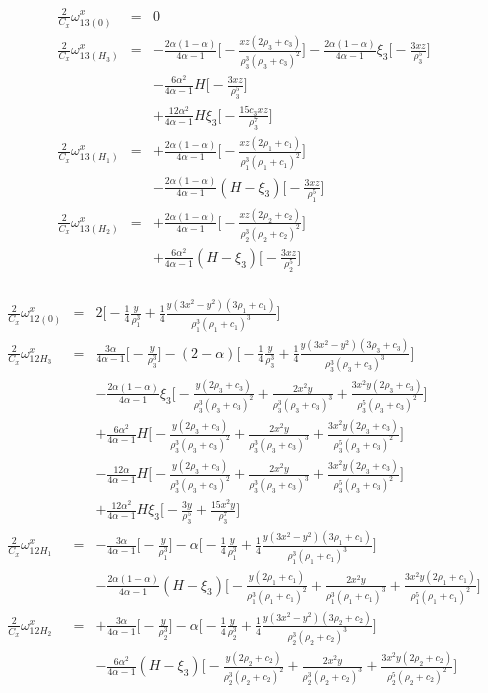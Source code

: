 \documentclass[a4j,fleqn]{jarticle}
\newcommand{\al}{\alpha}
\newcommand{\all}{4\alpha-1}
\newcommand{\cc}[1]{c_{#1}}
\newcommand{\rr}[1]{\rho_{#1}}
\newcommand{\rc}[1]{\rho_{#1}+\cc{#1}}
\begin{document}
\begin{eqnarray*}
\frac{2}{C_x}\omega_{13 (0)}^x&=&0\\
\frac{2}{C_x}\omega_{13 (H_3)}^x&=&
 -\frac{2\al(1-\al)}{\all}\biggr[
 -\frac{xz(2\rr3+\cc3)}{\rr3^3(\rc3)^2}
 \biggr]
%
-\frac{2\al(1-\al)}{\all}\xi_3\biggr[
-\frac{3xz}{\rr3^5}
\biggr]\\
%
&&-\frac{6\al^2}{\all}H\biggr[
-\frac{3xz}{\rr3^5}
\biggr]\\
%
&&+\frac{12\al^2}{\all}H\xi_3\biggr[
-\frac{15\cc3 xz}{\rr3^7}
\biggr]\\
\frac{2}{C_x}\omega_{13 (H_1)}^x&=&
+\frac{2\al(1-\al)}{\all}\biggr[
 -\frac{xz(2\rr1+\cc1)}{\rr1^3(\rc1)^2}
 \biggr]\\
%
&&-\frac{2\al(1-\al)}{\all}(H-\xi_3)\biggr[
 -\frac{3xz}{\rr1^5}
 \biggr]\\
\frac{2}{C_x}\omega_{13 (H_2)}^x&=&
+\frac{2\al(1-\al)}{\all}\biggr[
 -\frac{xz(2\rr2+\cc2)}{\rr2^3(\rc2)^2}
 \biggr]\\
%
&&+\frac{6\al^2}{\all}(H-\xi_3)\biggr[
-\frac{3xz}{\rr2^5}
\biggr]\\
\end{eqnarray*}
\vspace{0.2cm}

\begin{eqnarray*}
\frac{2}{C_x}\omega_{12 (0)}^x&=&
2\biggr[
-\frac{1}{4}\frac{y}{\rr1^3}
+\frac{1}{4}\frac{y(3x^2-y^2)(3\rr1+\cc1)}{\rr1^3(\rc1)^3}
\biggr]\\
\frac{2}{C_x}\omega_{12 H_3}^x&=&
\frac{3\al}{\all}\biggr[
-\frac{y}{\rr3^3}
\biggr]
-(2-\al)\biggr[
-\frac{1}{4}\frac{y}{\rr3^3}
+\frac{1}{4}\frac{y(3x^2-y^2)(3\rr3+\cc3)}{\rr3^3(\rc3)^3}
\biggr]\\
%
&&-\frac{2\al(1-\al)}{\all}\xi_3\biggr[
-\frac{y(2\rr3+\cc3)}{\rr3^3(\rc3)^2}+\frac{2x^2y}{\rr3^3(\rc3)^3}
+\frac{3x^2y(2\rr3+\cc3)}{\rr3^5(\rc3)^2}
\biggr]\\
%
&&+\frac{6\al^2}{\all}H\biggr[
-\frac{y(2\rr3+\cc3)}{\rr3^3(\rc3)^2}+\frac{2x^2y}{\rr3^3(\rc3)^3}
+\frac{3x^2y(2\rr3+\cc3)}{\rr3^5(\rc3)^2}
\biggr]\\
%
&&-\frac{12\al}{\all}H\biggr[
-\frac{y(2\rr3+\cc3)}{\rr3^3(\rc3)^2}+\frac{2x^2y}{\rr3^3(\rc3)^3}
+\frac{3x^2y(2\rr3+\cc3)}{\rr3^5(\rc3)^2}
\biggr]\\
%
&&+\frac{12\al^2}{\all}H\xi_3\biggr[
-\frac{3y}{\rr3^5}+\frac{15x^2y}{\rr3^7}
\biggr]\\
\frac{2}{C_x}\omega_{12 H_1}^x&=&
-\frac{3\al}{\all}\biggr[
-\frac{y}{\rr1^3}
\biggr]
-\al\biggr[
-\frac{1}{4}\frac{y}{\rr1^3}
+\frac{1}{4}\frac{y(3x^2-y^2)(3\rr1+\cc1)}{\rr1^3(\rc1)^3}
\biggr]\\
%
&&-\frac{2\al(1-\al)}{\all}(H-\xi_3)\biggr[
-\frac{y(2\rr1+\cc1)}{\rr1^3(\rc1)^2}+\frac{2x^2y}{\rr1^3(\rc1)^3}
+\frac{3x^2y(2\rr1+\cc1)}{\rr1^5(\rc1)^2}
\biggr]\\
\frac{2}{C_x}\omega_{12 H_2}^x&=&
+\frac{3\al}{\all}\biggr[
-\frac{y}{\rr2^3}
\biggr]
-\al\biggr[
-\frac{1}{4}\frac{y}{\rr2^3}
+\frac{1}{4}\frac{y(3x^2-y^2)(3\rr2+\cc2)}{\rr2^3(\rc2)^3}
\biggr]\\
%
&&-\frac{6\al^2}{\all}(H-\xi_3)\biggr[
-\frac{y(2\rr2+\cc2)}{\rr2^3(\rc2)^2}+\frac{2x^2y}{\rr2^3(\rc2)^3}
+\frac{3x^2y(2\rr2+\cc2)}{\rr2^5(\rc2)^2}
\biggr]
\end{eqnarray*}
\end{document}
